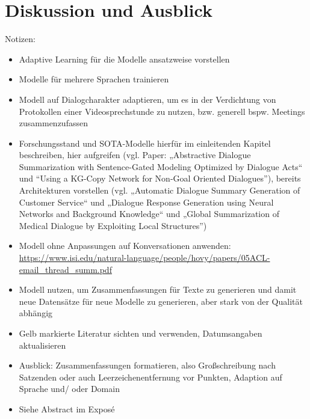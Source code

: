 \chapter{Diskussion und Ausblick}
\thispagestyle{fancy}
\label{chap:Diskussion und Ausblick}

Notizen:
\begin{itemize}
	\item Adaptive Learning für die Modelle ansatzweise vorstellen
	\item Modelle für mehrere Sprachen trainieren
	\item Modell auf Dialogcharakter adaptieren, um es in der Verdichtung von Protokollen einer Videosprechstunde zu nutzen, bzw. generell bspw. Meetings zusammenzufassen
	\item Forschungsstand und SOTA-Modelle hierfür im einleitenden Kapitel beschreiben, hier aufgreifen (vgl. Paper: „Abstractive Dialogue Summarization with Sentence-Gated Modeling Optimized by Dialogue Acts“ und “Using a KG-Copy Network for Non-Goal Oriented Dialogues”), bereits Architekturen vorstellen (vgl. „Automatic Dialogue Summary Generation of Customer Service“ und „Dialogue Response Generation using Neural Networks and Background Knowledge“ und „Global Summarization of Medical Dialogue by Exploiting Local Structures”)
	\item Modell ohne Anpassungen auf Konversationen anwenden: \url{https://www.isi.edu/natural-language/people/hovy/papers/05ACL-email_thread_summ.pdf}
	\item Modell nutzen, um Zusammenfassungen für Texte zu generieren und damit neue Datensätze für neue Modelle zu generieren, aber stark von der Qualität abhängig
	\item Gelb markierte Literatur sichten und verwenden, Datumsangaben aktualisieren
	\item Ausblick: Zusammenfassungen formatieren, also Großschreibung nach Satzenden oder auch Leerzeichenentfernung vor Punkten, Adaption auf Sprache und/ oder Domain
	\item Siehe Abstract im Exposé
\end{itemize}
